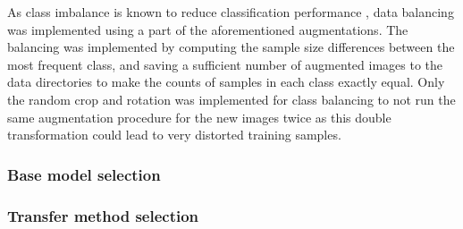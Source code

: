 \documentclass{article}
\begin{document}
As class imbalance is known to reduce classification performance \cite{heLearningImbalancedData2009},
data balancing was implemented using a part of the aforementioned augmentations.
The balancing was implemented by computing the sample size differences between 
the most frequent class, and saving a sufficient number of augmented images 
to the data directories to make the counts of samples in each class 
exactly equal. Only the random crop and rotation was implemented for class 
balancing to not run the same augmentation procedure for the new images twice as 
this double transformation could lead to very distorted training samples.

\subsubsection{Base model selection}





\subsubsection{Transfer method selection}

\end{document}
